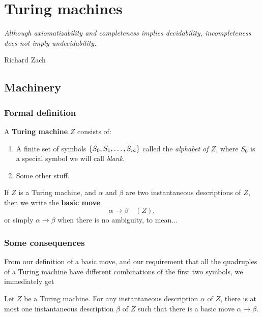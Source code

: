 \chapter{Turing machines}

\epigraph{\itshape\myopeningquote Although axiomatizability and
    completeness implies decidability, incompleteness does not
    imply undecidability.\myclosingquote}
{Richard Zach \cite{Zach2021}}

\section{Machinery}

\subsection{Formal definition}

\begin{defn}
    A \textbf{Turing machine} $Z$ consists of:
    \begin{enumerate}
        \item A finite set of symbols $\qty{S_0, S_1,\dotsc,
            S_m}$ called the \textit{alphabet of $Z$}, where
            $S_0$ is a special symbol we will call
            \textit{blank}.
        \item  Some other stuff.
    \end{enumerate}
\end{defn}

\begin{defn} \label{def:basic_move}
    If $Z$ is a Turing machine, and $\alpha$ and $\beta$ are two
    instantaneous descriptions of $Z$, then we write the
    \textbf{basic move}
    \begin{equation*}
        \alpha \to \beta\quad (Z),
    \end{equation*}
    or simply $\alpha \to \beta$ when there is no ambiguity, to
    mean...
\end{defn}

\subsection{Some consequences}

From our definition of a basic move, and our requirement that all
the quadruples of a Turing machine have different combinations of
the first two symbols, we immediately get 

\begin{theorem} \label{thm:unique_move}
    Let $Z$ be a Turing machine. For any instantaneous
    description $\alpha$ of $Z$, there is at most one
    instantaneous description $\beta$ of $Z$ such that there is a
    basic move $\alpha \to \beta$.
\end{theorem}

